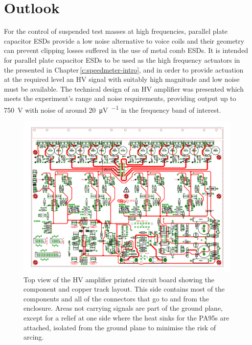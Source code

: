 \section{Outlook}
For the control of suspended test masses at high frequencies, parallel plate capacitor \glspl{ESD} provide a low noise alternative to voice coils and their geometry can prevent clipping losses suffered in the use of metal comb \glspl{ESD}. It is intended for parallel plate capacitor \glspl{ESD} to be used as the high frequency actuators in the \SSMEXPT{} presented in Chapter\,\ref{c:speedmeter-intro}, and in order to provide actuation at the required level an \gls{HV} signal with suitably high magnitude and low noise must be available. The technical design of an \gls{HV} amplifier was presented which meets the experiment's range and noise requirements, providing output up to \SI{750}{\volt} with noise of around \SI{20}{\micro\volt\per\sqrthz} in the frequency band of interest.

\begin{figure}
  \includegraphics[width=\textwidth]{graphics/60-hv-amp-top.pdf}
  \caption[High voltage amplifier board, top view]{\label{fig:hv-amp-top}Top view of the \gls{HV} amplifier printed circuit board showing the component and copper track layout. This side contains most of the components and all of the connectors that go to and from the enclosure. Areas not carrying signals are part of the ground plane, except for a relief at one side where the heat sinks for the PA95s are attached, isolated from the ground plane to minimise the risk of arcing.}
\end{figure}

